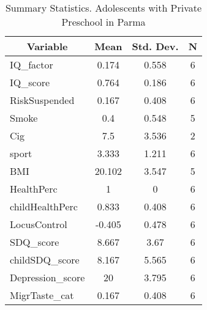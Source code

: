 
\begin{table}[htbp]\centering \caption{Summary Statistics. Adolescents with Private Preschool in Parma \label{bothAdolmaternaPrivParma}}
\begin{tabular}{l c c  c}\hline\hline
\multicolumn{1}{c}{\textbf{Variable}} & \textbf{Mean}
 & \textbf{Std. Dev.} & \textbf{N}\\ \hline
IQ\_factor & 0.174 & 0.558  & 6\\
IQ\_score & 0.764 & 0.186  & 6\\
RiskSuspended & 0.167 & 0.408  & 6\\
Smoke & 0.4 & 0.548  & 5\\
Cig & 7.5 & 3.536  & 2\\
sport & 3.333 & 1.211  & 6\\
BMI & 20.102 & 3.547  & 5\\
HealthPerc & 1 & 0  & 6\\
childHealthPerc & 0.833 & 0.408  & 6\\
LocusControl & -0.405 & 0.478  & 6\\
SDQ\_score & 8.667 & 3.67  & 6\\
childSDQ\_score & 8.167 & 5.565  & 6\\
Depression\_score & 20 & 3.795  & 6\\
MigrTaste\_cat & 0.167 & 0.408  & 6\\
\hline\end{tabular}
\end{table}
